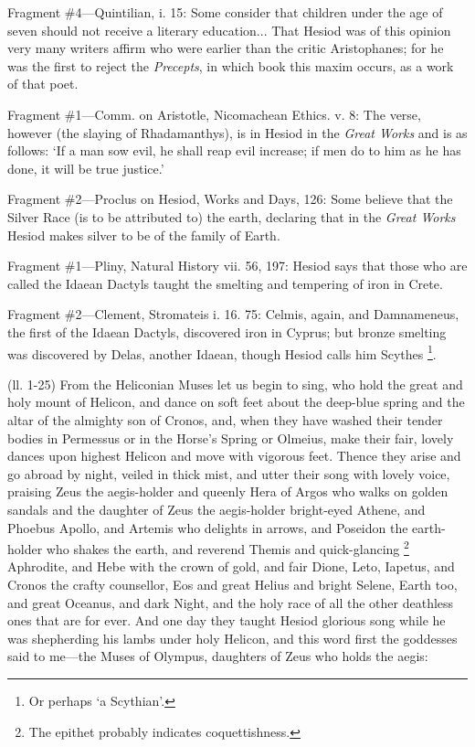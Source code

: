 Fragment \#4—Quintilian, i. 15: Some consider that children under the age
of seven should not receive a literary education... That Hesiod was of this
opinion very many writers affirm who were earlier than the critic Aristophanes;
for he was the first to reject the \emph{Precepts}, in which book this maxim
occurs, as a work of that poet.


Fragment \#1—Comm. on Aristotle, Nicomachean Ethics. v. 8: The verse,
however (the slaying of Rhadamanthys), is in Hesiod in the \emph{Great
Works} and is as follows: ‘If a man sow evil, he shall reap evil
increase; if men do to him as he has done, it will be true justice.’

Fragment \#2—Proclus on Hesiod, Works and Days, 126: Some believe that the
Silver Race (is to be attributed to) the earth, declaring that in the
\emph{Great Works} Hesiod makes silver to be of the family of Earth.


Fragment \#1—Pliny, Natural History vii. 56, 197: Hesiod says that those
who are called the Idaean Dactyls taught the smelting and tempering of iron in
Crete.

Fragment \#2—Clement, Stromateis i. 16. 75: Celmis, again, and
Damnameneus, the first of the Idaean Dactyls, discovered iron in Cyprus; but
bronze smelting was discovered by Delas, another Idaean, though Hesiod calls
him Scythes \footnote{Or perhaps ‘a
Scythian’.}.


(ll. 1-25) From the Heliconian Muses let us begin to sing, who hold the great
and holy mount of Helicon, and dance on soft feet about the deep-blue spring
and the altar of the almighty son of Cronos, and, when they have washed their
tender bodies in Permessus or in the Horse’s Spring or Olmeius, make
their fair, lovely dances upon highest Helicon and move with vigorous feet.
Thence they arise and go abroad by night, veiled in thick mist, and utter their
song with lovely voice, praising Zeus the aegis-holder and queenly Hera of
Argos who walks on golden sandals and the daughter of Zeus the aegis-holder
bright-eyed Athene, and Phoebus Apollo, and Artemis who delights in arrows, and
Poseidon the earth-holder who shakes the earth, and reverend Themis and
quick-glancing \footnote{The epithet probably
indicates coquettishness.} Aphrodite, and Hebe with the
crown of gold, and fair Dione, Leto, Iapetus, and Cronos the crafty counsellor,
Eos and great Helius and bright Selene, Earth too, and great Oceanus, and dark
Night, and the holy race of all the other deathless ones that are for ever. And
one day they taught Hesiod glorious song while he was shepherding his lambs
under holy Helicon, and this word first the goddesses said to me—the
Muses of Olympus, daughters of Zeus who holds the aegis:

